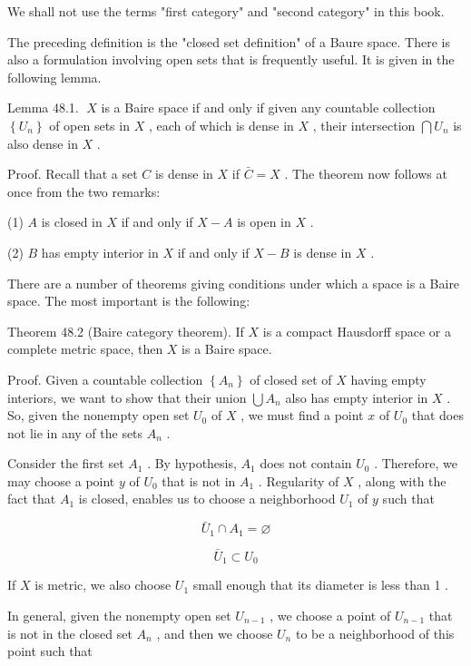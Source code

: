 \documentclass[10pt]{article}
\begin{document}
We shall not use the terms "first category" and "second category" in this book.

The preceding definition is the "closed set definition" of a Baure space. There is also a formulation involving open sets that is frequently useful. It is given in the following lemma.

Lemma 48.1. \(\;X\) is a Baire space if and only if given any countable collection \(\left\{  {U}_{n}\right\}\) of open sets in \(X\) , each of which is dense in \(X\) , their intersection \(\bigcap {U}_{n}\) is also dense in \(X\) .

Proof. Recall that a set \(C\) is dense in \(X\) if \(\bar{C} = X\) . The theorem now follows at once from the two remarks:

(1) \(A\) is closed in \(X\) if and only if \(X - A\) is open in \(X\) .

(2) \(B\) has empty interior in \(X\) if and only if \(X - B\) is dense in \(X\) .

There are a number of theorems giving conditions under which a space is a Baire space. The most important is the following:

Theorem 48.2 (Baire category theorem). If \(X\) is a compact Hausdorff space or a complete metric space, then \(X\) is a Baire space.

Proof. Given a countable collection \(\left\{  {A}_{n}\right\}\) of closed set of \(X\) having empty interiors, we want to show that their union \(\bigcup {A}_{n}\) also has empty interior in \(X\) . So, given the nonempty open set \({U}_{0}\) of \(X\) , we must find a point \(x\) of \({U}_{0}\) that does not lie in any of the sets \({A}_{n}\) .

Consider the first set \({A}_{1}\) . By hypothesis, \({A}_{1}\) does not contain \({U}_{0}\) . Therefore, we may choose a point \(y\) of \({U}_{0}\) that is not in \({A}_{1}\) . Regularity of \(X\) , along with the fact that \({A}_{1}\) is closed, enables us to choose a neighborhood \({U}_{1}\) of \(y\) such that

\[
{\bar{U}}_{1} \cap  {A}_{1} = \varnothing
\]

\[
{\bar{U}}_{1} \subset  {U}_{0}
\]

If \(X\) is metric, we also choose \({U}_{1}\) small enough that its diameter is less than 1 .

In general, given the nonempty open set \({U}_{n - 1}\) , we choose a point of \({U}_{n - 1}\) that is not in the closed set \({A}_{n}\) , and then we choose \({U}_{n}\) to be a neighborhood of this point such that
\end{document}
